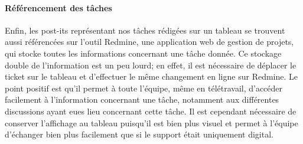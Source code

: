 \paragraph{Référencement des tâches}
Enfin, les post-its représentant nos tâches rédigées sur un tableau se trouvent aussi référencées sur l'outil Redmine, une application web de gestion de projets, qui stocke toutes les informations concernant une tâche donnée.
Ce stockage double de l'information est un peu lourd; en effet, il est nécessaire de déplacer le ticket sur le tableau et d'effectuer le même changement en ligne sur Redmine.
Le point positif est qu'il permet à toute l'équipe, même en télétravail, d'accéder facilement à l'information concernant une tâche, notamment aux différentes discussions ayant eues lieu concernant cette tâche.
Il est cependant nécessaire de conserver l'affichage au tableau puisqu'il est bien plus visuel et permet à l'équipe d'échanger bien plus facilement que si le support était uniquement digital.
